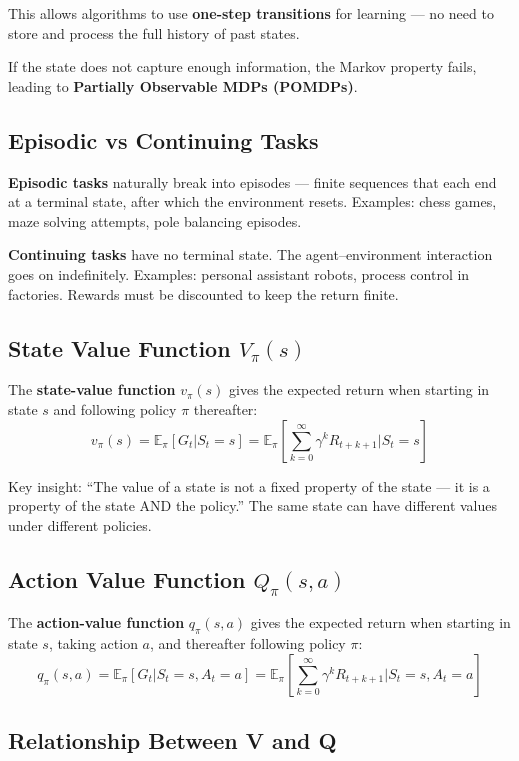 \documentclass[11pt,a4paper]{article}
\begin{document}
This allows algorithms to use \textbf{one-step transitions} for learning --- no need to store and process the full history of past states.

If the state does not capture enough information, the Markov property fails, leading to \textbf{Partially Observable MDPs (POMDPs)}.

\subsection{Episodic vs Continuing Tasks}

\textbf{Episodic tasks} naturally break into episodes --- finite sequences that each end at a terminal state, after which the environment resets. Examples: chess games, maze solving attempts, pole balancing episodes.

\textbf{Continuing tasks} have no terminal state. The agent--environment interaction goes on indefinitely. Examples: personal assistant robots, process control in factories. Rewards must be discounted to keep the return finite.

\subsection{State Value Function $V_\pi(s)$}

The \textbf{state-value function} $v_\pi(s)$ gives the expected return when starting in state $s$ and following policy $\pi$ thereafter:
\[
v_\pi(s) = \mathbb{E}_\pi[G_t | S_t = s] = \mathbb{E}_\pi\left[\sum_{k=0}^{\infty} \gamma^k R_{t+k+1} \bigg| S_t = s\right]
\]

Key insight: ``The value of a state is not a fixed property of the state --- it is a property of the state AND the policy.'' The same state can have different values under different policies.

\subsection{Action Value Function $Q_\pi(s, a)$}

The \textbf{action-value function} $q_\pi(s, a)$ gives the expected return when starting in state $s$, taking action $a$, and thereafter following policy $\pi$:
\[
q_\pi(s, a) = \mathbb{E}_\pi[G_t | S_t = s, A_t = a] = \mathbb{E}_\pi\left[\sum_{k=0}^{\infty} \gamma^k R_{t+k+1} \bigg| S_t = s, A_t = a\right]
\]

\subsection{Relationship Between V and Q}
\end{document}
